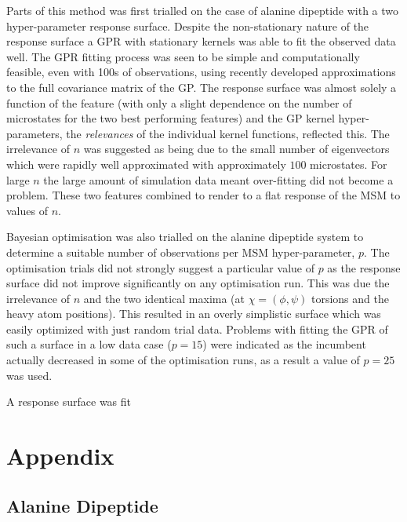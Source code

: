 Parts of this method was first trialled on the case of alanine dipeptide with a two hyper-parameter response surface. Despite the non-stationary nature of the response surface a GPR with stationary kernels was able to fit the observed data well. The GPR fitting process was seen to be simple and computationally feasible, even with 100s of observations, using recently developed approximations to the full covariance matrix of the GP. The response surface was almost solely a function of the feature (with only a slight dependence on the number of microstates for the two best performing features) and the GP kernel hyper-parameters, the \emph{relevances} of the individual kernel functions, reflected this. The irrelevance of $n$ was suggested as being due to the small number of eigenvectors which were rapidly well approximated with approximately $100$ microstates. For large $n$ the large amount of simulation data meant over-fitting did not become a problem. These two features combined to render to a flat response of the MSM to values of $n$. 

Bayesian optimisation was also trialled on the alanine dipeptide system to determine a suitable number of observations per MSM hyper-parameter, $p$. The optimisation trials did not strongly suggest a particular value of $p$ as the response surface did not improve significantly on any optimisation run. This was due the irrelevance of $n$ and the two identical maxima (at $\chi=(\phi, \psi)$ torsions and the heavy atom positions).  This resulted in an overly simplistic surface which was easily optimized with just random trial data. Problems with fitting the GPR of such a surface in a low data case ($p=15$) were indicated as the incumbent actually decreased in some of the optimisation runs, as a result a value of $p=25$ was used. 

A response surface was fit






\section{Appendix}\label{app:msm_opt}

\subsection{Alanine Dipeptide}

